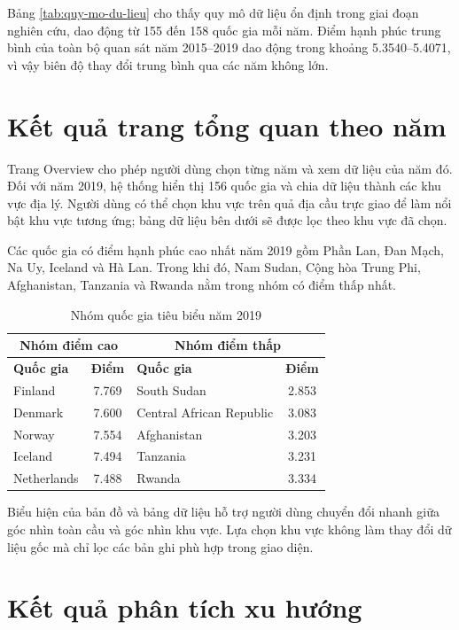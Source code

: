 Bảng \ref{tab:quy-mo-du-lieu} cho thấy quy mô dữ liệu ổn định trong giai đoạn nghiên cứu, dao động từ 155 đến 158 quốc gia mỗi năm. Điểm hạnh phúc trung bình của toàn bộ quan sát năm 2015--2019 dao động trong khoảng 5.3540--5.4071, vì vậy biên độ thay đổi trung bình qua các năm không lớn.

\section{Kết quả trang tổng quan theo năm}

Trang Overview cho phép người dùng chọn từng năm và xem dữ liệu của năm đó. Đối với năm 2019, hệ thống hiển thị 156 quốc gia và chia dữ liệu thành các khu vực địa lý. Người dùng có thể chọn khu vực trên quả địa cầu trực giao để làm nổi bật khu vực tương ứng; bảng dữ liệu bên dưới sẽ được lọc theo khu vực đã chọn.

Các quốc gia có điểm hạnh phúc cao nhất năm 2019 gồm Phần Lan, Đan Mạch, Na Uy, Iceland và Hà Lan. Trong khi đó, Nam Sudan, Cộng hòa Trung Phi, Afghanistan, Tanzania và Rwanda nằm trong nhóm có điểm thấp nhất.

\begin{table}[H]
\centering
\begin{tabular}{|p{5.2cm}|c|p{5.2cm}|c|}
\hline
\multicolumn{2}{|c|}{\textbf{Nhóm điểm cao}} & \multicolumn{2}{c|}{\textbf{Nhóm điểm thấp}} \\
\hline
\textbf{Quốc gia} & \textbf{Điểm} & \textbf{Quốc gia} & \textbf{Điểm} \\
\hline
Finland & 7.769 & South Sudan & 2.853 \\
\hline
Denmark & 7.600 & Central African Republic & 3.083 \\
\hline
Norway & 7.554 & Afghanistan & 3.203 \\
\hline
Iceland & 7.494 & Tanzania & 3.231 \\
\hline
Netherlands & 7.488 & Rwanda & 3.334 \\
\hline
\end{tabular}
\caption{Nhóm quốc gia tiêu biểu năm 2019}
\label{tab:quoc-gia-tieu-bieu}
\end{table}

Biểu hiện của bản đồ và bảng dữ liệu hỗ trợ người dùng chuyển đổi nhanh giữa góc nhìn toàn cầu và góc nhìn khu vực. Lựa chọn khu vực không làm thay đổi dữ liệu gốc mà chỉ lọc các bản ghi phù hợp trong giao diện.

\section{Kết quả phân tích xu hướng}

